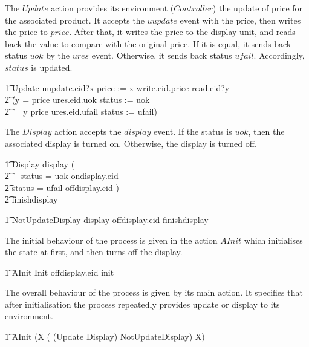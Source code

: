 The $Update$ action provides its environment ($Controller$) the update of price for the associated product. It accepts the $uupdate$ event with the price, then writes the price to $price$. After that, it writes the price to the display unit, and reads back the value to compare with the original price. If it is equal, it sends back status $uok$ by the $ures$ event. Otherwise, it sends back status $ufail$. Accordingly, $status$ is updated.
\begin{circusaction}
        \t1 Update \circdef uupdate.eid?x \then price := x \circseq write.eid.price \then read.eid?y \\
            \t2 \then (\lcircguard y = price \rcircguard \circguard ures.eid.uok \then status := uok \\
            \t2 \,\,\,\,\,\, \extchoice \lcircguard y \neq price \rcircguard \circguard ures.eid.ufail \then status := ufail) \\
\end{circusaction}
The $Display$ action accepts the $display$ event. If the status is $uok$, then the associated display is turned on. Otherwise, the display is turned off.
\begin{circusaction}
        \t1 Display \circdef display \then (\\
            \t2 \,\,\,\, \lcircguard status = uok \rcircguard \circguard ondisplay.eid \then \Skip \\
            \t2 \extchoice \lcircguard status = ufail \rcircguard \circguard offdisplay.eid \then \Skip) \\
            \t2 \circseq finishdisplay \then \Skip
\end{circusaction}
\begin{circusaction}
        \t1 NotUpdateDisplay \circdef display \then offdisplay.eid \then finishdisplay \then \Skip \\
\end{circusaction}
The initial behaviour of the process is given in the action $AInit$ which initialises the state at first, and then turns off the display.
\begin{circusaction}
        \t1 AInit \circdef \lschexpract Init \rschexpract \circseq offdisplay.eid \then init \then \Skip\\
\end{circusaction}
The overall behaviour of the process is given by its main action. It specifies that after initialisation the process repeatedly provides update or display to its environment.
\begin{circusaction}
	    \t1 \circspot AInit \circseq (\circmu X \circspot ( (Update \circseq Display) \extchoice NotUpdateDisplay) \circseq X) \\
\end{circusaction}
\begin{circus}
	\circend
\end{circus}

